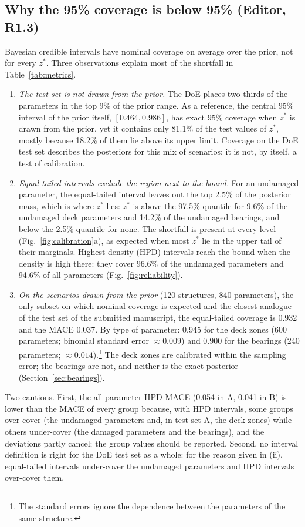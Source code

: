 \documentclass[11pt]{article}
\begin{document}
\subsection{Why the 95\% coverage is below 95\% (Editor, R1.3)}\label{sec:coverage}
Bayesian credible intervals have nominal coverage on average over the prior, not for every $z^*$. Three observations
explain most of the shortfall in Table~\ref{tab:metrics}.
\begin{enumerate}[label=(\roman*)]
\item \emph{The test set is not drawn from the prior.} The DoE places two thirds of the parameters in the top 9\% of
the prior range. As a reference, the central 95\% interval of the prior itself, $[0.464,0.986]$, has exact 95\%
coverage when $z^*$ is drawn from the prior, yet it contains only 81.1\% of the test values of $z^*$, mostly because
18.2\% of them lie above its upper limit. Coverage on the DoE test set describes the posteriors for this mix of
scenarios; it is not, by itself, a test of calibration.
\item \emph{Equal-tailed intervals exclude the region next to the bound.} For an undamaged parameter, the
equal-tailed interval leaves out the top 2.5\% of the posterior mass, which is where $z^*$ lies: $z^*$ is above the
97.5\% quantile for 9.6\% of the undamaged deck parameters and 14.2\% of the undamaged bearings, and below the 2.5\%
quantile for none. The shortfall is present at every level (Fig.~\ref{fig:calibration}a), as expected when most
$z^*$ lie in the upper tail of their marginals. Highest-density (HPD) intervals reach the bound when the density is high
there: they cover 96.6\% of the undamaged parameters and 94.6\% of all parameters (Fig.~\ref{fig:reliability}).
\item \emph{On the scenarios drawn from the prior} (120 structures, 840 parameters), the only subset on which nominal
coverage is expected and the closest analogue of the test set of the submitted manuscript, the equal-tailed coverage is
0.932 and the MACE 0.037. By type of parameter: 0.945 for the deck zones (600 parameters; binomial standard error
$\approx0.009$) and 0.900 for the bearings (240 parameters; $\approx0.014$).\footnote{The standard errors ignore the
dependence between the parameters of the same structure.} The deck zones are calibrated within the sampling error;
the bearings are not, and neither is the exact posterior (Section~\ref{sec:bearings}).
\end{enumerate}
Two cautions. First, the all-parameter HPD MACE (0.054 in A, 0.041 in B) is lower than the MACE of every group
because, with HPD intervals, some groups over-cover (the undamaged parameters and, in test set A, the deck zones) while
others under-cover (the damaged parameters and the bearings), and the deviations partly cancel; the group values
should be reported. Second, no interval
definition is right for the DoE test set as a whole: for the reason given in (ii), equal-tailed intervals under-cover
the undamaged parameters and HPD intervals over-cover them.
\end{document}
